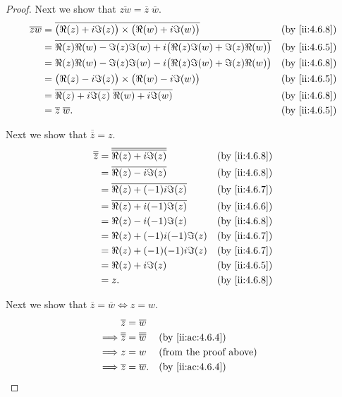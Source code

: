 \begin{proof}
  Next we show that \(\overline{zw} = \overline{z} \; \overline{w}\).
  \begin{align*}
    \overline{zw} & = \overline{\big(\Re(z) + i \Im(z)\big) \times \big(\Re(w) + i \Im(w)\big)}            &  & \by{ii:4.6.8} \\
                  & = \overline{\Re(z) \Re(w) - \Im(z) \Im(w) + i \big(\Re(z) \Im(w) + \Im(z) \Re(w)\big)} &  & \by{ii:4.6.5} \\
                  & = \Re(z) \Re(w) - \Im(z) \Im(w) - i \big(\Re(z) \Im(w) + \Im(z) \Re(w)\big)            &  & \by{ii:4.6.8} \\
                  & = \big(\Re(z) - i \Im(z)\big) \times \big(\Re(w) - i \Im(w)\big)                       &  & \by{ii:4.6.5} \\
                  & = \overline{\Re(z) + i \Im(z)} \; \overline{\Re(w) + i \Im(w)}                         &  & \by{ii:4.6.8} \\
                  & = \overline{z} \; \overline{w}.                                                        &  & \by{ii:4.6.5}
  \end{align*}

  Next we show that \(\overline{\overline{z}} = z\).
  \begin{align*}
    \overline{\overline{z}} & = \overline{\overline{\Re(z) + i \Im(z)}} &  & \by{ii:4.6.8} \\
                            & = \overline{\Re(z) - i \Im(z)}            &  & \by{ii:4.6.8} \\
                            & = \overline{\Re(z) + (-1) i \Im(z)}       &  & \by{ii:4.6.7} \\
                            & = \overline{\Re(z) + i (-1) \Im(z)}       &  & \by{ii:4.6.6} \\
                            & = \Re(z) - i (-1) \Im(z)                  &  & \by{ii:4.6.8} \\
                            & = \Re(z) + (-1) i (-1) \Im(z)             &  & \by{ii:4.6.7} \\
                            & = \Re(z) + (-1) (-1) i \Im(z)             &  & \by{ii:4.6.7} \\
                            & = \Re(z) + i \Im(z)                       &  & \by{ii:4.6.5} \\
                            & = z.                                      &  & \by{ii:4.6.8}
  \end{align*}

  Next we show that \(\overline{z} = \overline{w} \iff z = w\).
  \begin{align*}
             & \overline{z} = \overline{w}                                                          \\
    \implies & \overline{\overline{z}} = \overline{\overline{w}} &  & \by{ii:ac:4.6.4}              \\
    \implies & z = w                                             &  & \text{(from the proof above)} \\
    \implies & \overline{z} = \overline{w}.                      &  & \by{ii:ac:4.6.4}
  \end{align*}


\end{proof}
